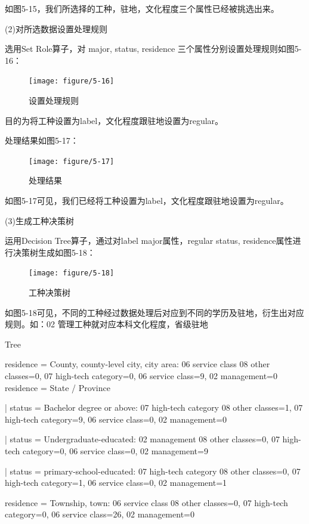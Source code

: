 如图5-15，我们所选择的工种，驻地，文化程度三个属性已经被挑选出来。

(2)对所选数据设置处理规则

选用Set Role算子，对 major, status, residence 三个属性分别设置处理规则如图5-16：

\begin{figure}[thbp!]
	\centering
	\texttt{[image: figure/5-16]}
	\caption{设置处理规则}
	\label{fig:5-16}
\end{figure}

目的为将工种设置为label，文化程度跟驻地设置为regular。

处理结果如图5-17：

\begin{figure}[thbp!]
	\centering
	\texttt{[image: figure/5-17]}
	\caption{处理结果}
	\label{fig:5-17}
\end{figure}

如图5-17可见，我们已经将工种设置为label，文化程度跟驻地设置为regular。

(3)生成工种决策树

运用Decision Tree算子，通过对label major属性，regular status, residence属性进行决策树生成如图5-18：

\begin{figure}[thbp!]
	\centering
	\texttt{[image: figure/5-18]}
	\caption{工种决策树}
	\label{fig:5-18}
\end{figure}

如图5-18可见，不同的工种经过数据处理后对应到不同的学历及驻地，衍生出对应规则。如：02 管理工种就对应本科文化程度，省级驻地

Tree 

residence = County, county-level city, city area: 06 service class {08 other classes=0, 07 high-tech category=0, 06 service class=9, 02 management=0}
residence = State / Province

|   status = Bachelor degree or above: 07 high-tech category {08 other classes=1, 07 high-tech category=9, 06 service class=0, 02 management=0}

|   status = Undergraduate-educated: 02 management {08 other classes=0, 07 high-tech category=0, 06 service class=0, 02 management=9}

|   status = primary-school-educated: 07 high-tech category {08 other classes=0, 07 high-tech category=1, 06 service class=0, 02 management=1}

residence = Township, town: 06 service class {08 other classes=0, 07 high-tech category=0, 06 service class=26, 02 management=0}
